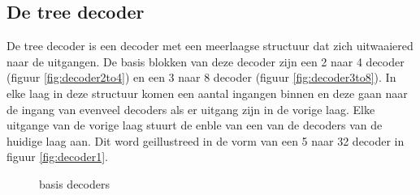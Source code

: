 \subsection{De tree decoder}
De tree decoder is een decoder met een meerlaagse structuur dat zich uitwaaiered naar de uitgangen. De basis blokken van deze decoder zijn een 2 naar 4 decoder (figuur \ref{fig:decoder2to4}) en een 3 naar 8 decoder (figuur \ref{fig:decoder3to8}). In elke laag in deze structuur komen een aantal ingangen binnen en deze gaan naar de ingang van evenveel decoders als er uitgang zijn in de vorige laag. Elke uitgange van de vorige laag stuurt de enble van een van de decoders van de huidige laag aan. Dit word geillustreed in de vorm van een 5 naar 32 decoder in figuur \ref{fig:decoder1}. 
\begin{figure}[!ht]
\centering
{}
\caption{basis decoders}
\end{figure}


